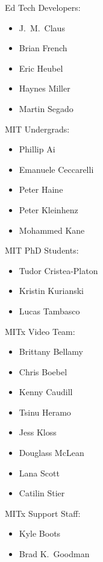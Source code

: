 \documentclass[pdftex, brazil, 12pt, twoside]{article}
\begin{document}
Ed Tech Developers:
\begin{itemize}[noitemsep]
\item J.\ M.\ Claus
\item Brian French
\item Eric Heubel
\item Haynes Miller
\item Martin Segado
\end{itemize}

MIT Undergrads:
\begin{itemize}[noitemsep]
\item Phillip Ai
\item Emanuele Ceccarelli
\item Peter Haine
\item Peter Kleinhenz
\item Mohammed Kane
\end{itemize}

MIT PhD Students:
\begin{itemize}[noitemsep]
\item Tudor Cristea-Platon
\item Kristin Kurianski
\item Lucas Tambasco
\end{itemize}

MITx Video Team:
\begin{itemize}[noitemsep]
\item Brittany Bellamy
\item Chris Boebel
\item Kenny Caudill
\item Tsinu Heramo
\item Jess Kloss
\item Douglass McLean
\item Lana Scott
\item Catilin Stier
\end{itemize}

MITx Support Staff:
\begin{itemize}[noitemsep]
\item Kyle Boots
\item Brad K.\ Goodman
\end{itemize}

\end{document}
